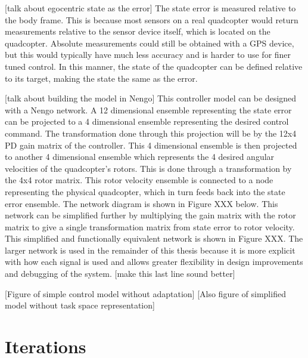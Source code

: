 \documentclass[letterpaper,12pt,titlepage,oneside,final]{book}
\begin{document}
[talk about egocentric state as the error]
The state error is measured relative to the body frame. This is because most sensors on a real quadcopter would return measurements relative to the sensor device itself, which is located on the quadcopter. Absolute measurements could still be obtained with a GPS device, but this would typically have much less accuracy and is harder to use for finer tuned control. In this manner, the state of the quadcopter can be defined relative to its target, making the state the same as the error.

[talk about building the model in Nengo]
This controller model can be designed with a Nengo network. A 12 dimensional ensemble representing the state error can be projected to a 4 dimensional ensemble representing the desired control command. The transformation done through this projection will be by the 12x4 PD gain matrix of the controller. This 4 dimensional ensemble is then projected to another 4 dimensional ensemble which represents the 4 desired angular velocities of the quadcopter’s rotors. This is done through a transformation by the 4x4 rotor matrix. This rotor velocity ensemble is connected to a node representing the physical quadcopter, which in turn feeds back into the state error ensemble. The network diagram is shown in Figure XXX below. This network can be simplified further by multiplying the gain matrix with the rotor matrix to give a single transformation matrix from state error to rotor velocity. This simplified and functionally equivalent network is shown in Figure XXX. The larger network is used in the remainder of this thesis because it is more explicit with how each signal is used and allows greater flexibility in design improvements and debugging of the system. [make this last line sound better]

[Figure of simple control model without adaptation]
[Also figure of simplified model without task space representation]

\section{Iterations}

\end{document}
